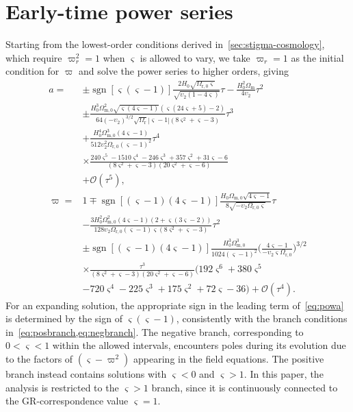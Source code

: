 \documentclass[aps,prd,reprint,preprintnumbers,showpacs,floatfix,nofootinbib,superscriptaddress]{revtex4-2}
\DeclareMathOperator{\sgn}{sgn}
\newcommand{\abs}[1]{\left\lvert #1 \right\rvert}
\newcommand{\cpr}{\varpi}
\begin{document}
\section{Early-time power series}
\label{app:stigma-power}
Starting from the lowest-order conditions derived in~\cref{sec:stigma-cosmology}, which require $\varpi_r^2=1$ when $\varsigma$ is allowed to vary, we take $\varpi_r=1$ as the initial condition for $\varpi$ and solve the power series to higher orders, giving
\begin{align}
  a = {}& \pm \sgn[\varsigma(\varsigma - 1)] \frac{2 H_0 \sqrt{\Omega_{\mathrm{r,0}} \varsigma}}{\sqrt{\upsilon_2 (1- 4 \varsigma)}}\tau - \frac{H_0^2 \Omega_\mathrm{m}}{4 \upsilon_2} \tau^2 \nonumber\\
	& \pm \frac{H_0^3 \Omega_{\mathrm{m, 0}}^2 \sqrt{\varsigma (4 \varsigma - 1)}(\varsigma(24 \varsigma + 5) -2)}{64(-\upsilon_2)^{3/2} \sqrt{\Omega_{\mathrm{r}}}\abs{\varsigma - 1}(8 \varsigma^2 + \varsigma -3)}\tau^3 \nonumber\\
	& + \frac{H_0^4 \Omega_\mathrm{m,0}^3 (4 \varsigma - 1)}{512 \upsilon_2^2 \Omega_\mathrm{r,0} (\varsigma - 1)^2} \tau^4 \nonumber\\
	& \times \frac{240\varsigma^5-1510\varsigma^4-246\varsigma^3+357\varsigma^2+31\varsigma-6}{(8 \varsigma^2 + \varsigma -3)(20 \varsigma^2 + \varsigma -6)} \nonumber\\
	& + \mathcal{O}(\tau^5), \label{eq:powa}\\
\cpr = {}& 1 \mp \sgn[(\varsigma-1)(4\varsigma - 1)]\frac{H_0 \Omega_{\mathrm{m, 0}}\sqrt{4 \varsigma - 1}}{8 \sqrt{- \upsilon_2 \Omega_{\mathrm{r, 0}} \varsigma}} \tau \nonumber\\
	& - \frac{3 H_0^2 \Omega_{\mathrm{m, 0}}^2 (4 \varsigma - 1)(2 + \varsigma(3 \varsigma - 2))}{128 \upsilon_2 \Omega_{\mathrm{r, 0}}(\varsigma - 1)\varsigma (8 \varsigma^2 + \varsigma -3)}\tau^2 \nonumber\\
	& \pm \sgn[(\varsigma-1)(4\varsigma - 1)]\frac{H_0^3\Omega_\mathrm{m, 0}^3}{1024(\varsigma-1)^2}\Big(\frac{4 \varsigma -1}{- \upsilon_2 \varsigma \Omega_\mathrm{r,0}}\Big)^{3/2} \nonumber\\
	& \times \frac{\tau^3}{(8 \varsigma^2 + \varsigma -3)(20 \varsigma^2 + \varsigma -6)} \Big(192 \varsigma^6 + 380 \varsigma^5 \nonumber\\
	& -720 \varsigma^4 -225 \varsigma^3 +175 \varsigma^2 + 72 \varsigma - 36\Big) + \mathcal{O}(\tau^4). \label{eq:powcp}
\end{align}
For an expanding solution, the appropriate sign in the leading term of~\cref{eq:powa} is determined by the sign of $\varsigma(\varsigma-1)$, consistently with the branch conditions in~\cref{eq:posbranch,eq:negbranch}. The negative branch, corresponding to $0<\varsigma<1$ within the allowed intervals, encounters poles during its evolution due to the factors of $(\varsigma-\varpi^2)$ appearing in the field equations. The positive branch instead contains solutions with $\varsigma<0$ and $\varsigma>1$. In this paper, the analysis is restricted to the $\varsigma>1$ branch, since it is continuously connected to the GR-correspondence value $\varsigma=1$.
\end{document}

